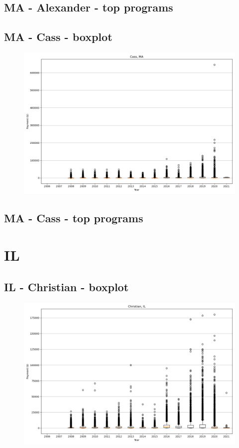 \subsection*{MA - Alexander - top programs}

\newpage
\subsection*{MA - Cass - boxplot}
\begin{figure}[h]
\centering
\includegraphics[width=7in]{../output/boxplots/counties/Cass-MA_boxplot.png}
\end{figure}


\subsection*{MA - Cass - top programs}

\newpage
\section*{IL}
\subsection*{IL - Christian - boxplot}
\begin{figure}[h]
\centering
\includegraphics[width=7in]{../output/boxplots/counties/Christian-IL_boxplot.png}
\end{figure}


